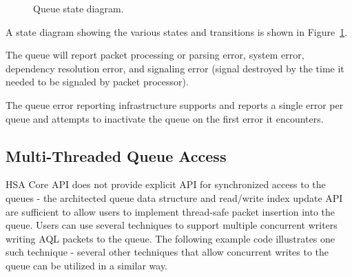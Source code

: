 \documentclass[draft]{book}
\begin{document}
\begin{figure}
  \centering
  \scriptsize
  \caption{Queue state diagram.}
  \label{fig:queuestate}
\end{figure}

A state diagram showing the various states and transitions is shown in
Figure~\ref{fig:queuestate}.

The queue will report packet processing or parsing error, system error,
dependency resolution error, and signaling error (signal destroyed by the time
it needed to be signaled by packet processor).

The queue error reporting infrastructure supports and reports a single error per
queue and attempts to inactivate the queue on the first error it encounters.

\hypertarget{multithreading}{}\subsection{Multi-Threaded Queue
  Access}\label{multithreading}
HSA Core API does not provide explicit API for synchronized access to the queues
- the architected queue data structure and read/write index update API are
sufficient to allow users to implement thread-safe packet insertion into the
queue. Users can use several techniques to support multiple concurrent writers
writing AQL packets to the queue. The following example code illustrates one
such technique - several other techniques that allow concurrent writes to the
queue can be utilized in a similar way.
\end{document}
